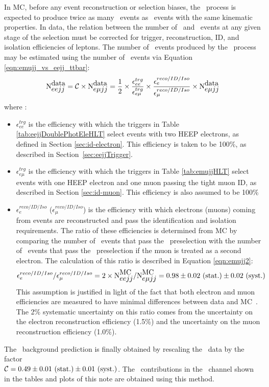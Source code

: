 In MC, before any event reconstruction or selection biases, the \ttbar~process is expected to 
produce twice as many \emujj~events as \eejj~events with the same kinematic properties.
In data, the relation between the number of \eejj~and \emujj~events at any given stage of the selection 
must be corrected for trigger, reconstruction, ID, and isolation efficiencies of leptons.
The number of \eejj~events produced by the \ttbar~process
may be estimated using the number of \emujj~events via Equation \ref{eqn:emujj_vs_eejj_ttbar}:
\begin{equation}
  \mbox{N}_{\mbox{$eejj$}}^{\mbox{data}} = \mathcal{C}  \times \mbox{N}_{\mbox{$e\mu jj$}}^{\mbox{data}} = \frac{1}{2} \times \frac{\epsilon_{ee}^{trg}}{\epsilon_{e\mu}^{trg}} \times \frac{\epsilon_{e}^{reco/ID/Iso}}{\epsilon_{\mu}^{reco/ID/Iso}} \times \mbox{N}_{\mbox{$e\mu jj$}}^{\mbox{data}} 
  \label{eqn:emujj_vs_eejj_ttbar}
\end{equation}
where :
\begin{itemize}
\item$\epsilon_{ee}^{trg}$ is the efficiency
  with which the triggers in Table \ref{tab:eejjDoublePhotEleHLT} 
  select events with two HEEP electrons, as defined in Section \ref{sec:id-electron}.
  This efficiency is taken to be 100\%, as described in Section~\ref{sec:eejjTrigger}.
\item $\epsilon_{e\mu}^{trg}$ is the efficiency with
  which the triggers in Table \ref{tab:emujjHLT} select 
  events with one HEEP electron and one muon passing the tight muon ID, as described
  in Section \ref{sec:id-muon}.  This efficiency is also assumed to be 100\%
\item $\epsilon_{e}^{reco/ID/Iso}$ ($\epsilon_{\mu}^{reco/ID/Iso}$) 
  is the efficiency with which electrons (muons) coming from \emujj events are
  reconstructed and pass the identification and isolation requirements.
  The ratio of these efficiencies is determined from MC by comparing the number of \eejj~events that pass
  the \eejj~preselection with the number of \emujj~events that pass the \eejj~preselection if 
  the muon is treated as a second electron.  The calculation of this ratio is described
  in Equation \ref{eqn:emujj2}:
  \begin{equation}
    \epsilon_{e}^{reco/ID/Iso} / \epsilon_{\mu}^{reco/ID/Iso} = 2 \times \mbox{N}_{\mbox{$eejj$}}^{\mbox{MC}} /\mbox{N}_{\mbox{$e\mu jj$}}^{\mbox{MC}} = \mbox{$ 0.98 \pm 0.02 \mbox{ (stat.)} \pm 0.02 \mbox{ (syst.)}$} 
    \label{eqn:emujj2}
  \end{equation}
  This assumption is justified in light of the fact that both electron and muon efficiencies are 
  measured to have minimal differences between data and MC~\cite{zprime-2011}.
  The 2\% systematic uncertainty on this ratio 
  comes from the uncertainty on the electron reconstruction efficiency (1.5\%) and
  the uncertainty on the muon reconstruction efficiency (1.0\%).
\end{itemize}
The \ttbar~background prediction is finally obtained by rescaling 
the \emujj~data by the factor \\ $\mathcal{C} = \mbox{$ 0.49 \pm 0.01 \mbox{ (stat.)} \pm 0.01 \mbox{ (syst.)}$}$. 
The \ttbar~contributions in the \eejj~channel shown in the tables and plots 
of this note are obtained using this method.

